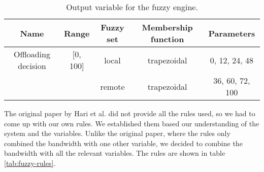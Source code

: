 \begin{table}
	\centering
	\begin{tabular}{|c|c|c|c|c|}
		\hline
		Name                & Range    & Fuzzy set & Membership function & Parameters      \\
		\hline
		Offloading decision & [0, 100] & local     & trapezoidal         & 0, 12, 24, 48   \\
		                    &          & remote    & trapezoidal         & 36, 60, 72, 100 \\
		\hline
	\end{tabular}
	\caption{Output variable for the fuzzy engine.}
	\label{tab:fuzzy-output}
\end{table}

The original paper by Hari et al. did not provide all the rules used, so we had to come up with our own rules. We established them based our
understanding of the system and the variables. Unlike the original paper, where the rules only combined the bandwidth with one other variable, we
decided to combine the bandwidth with all the relevant variables. The rules are shown in table \ref{tab:fuzzy-rules}.

